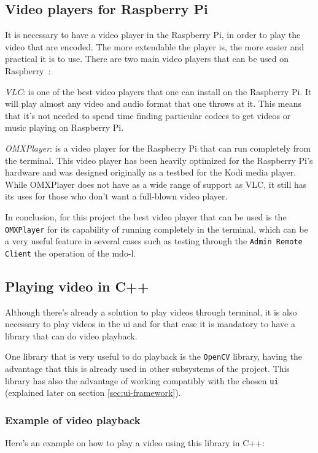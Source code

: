 \subsection{Video players for Raspberry Pi}
\label{sub-sec:video-player}
It is necessary to have a video player in the Raspberry Pi, in order to play the video that are encoded.
The more extendable the player is, the more easier and practical it is to use.
There are two main video players that can be used on Raspberry~\cite{video-player-rasp}:
%
\begin{item-c}
\item \emph{VLC}: is one of the best video players that one can install on the Raspberry Pi. It will play almost any video and audio format that one throws at it. This means that it's not needed to spend time finding particular codecs to get videos or music playing on Raspberry Pi.
\item \emph{OMXPlayer}: is a video player for the Raspberry Pi that can run completely from the terminal. This video player has been heavily optimized for the Raspberry Pi's hardware and was designed originally as a testbed for the Kodi media player. While OMXPlayer does not have as a wide range of support as VLC, it still has its uses for those who don't want a full-blown video player.
\end{item-c}

In conclusion, for this project the best video player that can be used is the \texttt{OMXPlayer} for its capability of running completely in the terminal, which can be a very useful feature in several cases such as testing through the \texttt{Admin Remote Client} the operation of the \gls{mdo-l}.

\subsection{Playing video in C++}
\label{sub-sec:play-video-cpp}
Although there's already a solution to play videos through terminal, it is also necessary to play videos in the \gls{ui} and for that case it is mandatory to have a library that can do video playback.

One library that is very useful to do playback is the \texttt{OpenCV} library, having the advantage that this is already used in other subsystems of the project.
This library has also the advantage of working compatibly with the chosen \texttt{ui} (explained later on section \ref{sec:ui-framework}). 

\subsubsection{Example of video playback}
Here's an example on how to play a video using this library in C++:


